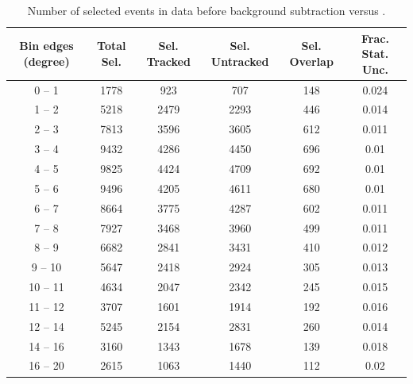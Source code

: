 \documentclass[aps,prl,twocolumn,showpacs,superscriptaddress,letterpaper,showkeys,superscriptaddress,floatfix,nofootinbib]{revtex4-1}
\begin{document}
\begin{table}[H]
  \centering
  \renewcommand{\arraystretch}{1.15}
  \caption{Number of selected events in data before background subtraction versus \thmu.}
    \begin{tabular}{c||c|c|c|c||c}
      Bin edges (degree) &  Total Sel. & Sel. Tracked & Sel. Untracked & Sel. Overlap & Frac. Stat. Unc. \\
      \hline
      \hline
        0 -- 1 & 1778 & 923 & 707 & 148 & 0.024 \\
        1 -- 2 & 5218 & 2479 & 2293 & 446 & 0.014 \\
        2 -- 3 & 7813 & 3596 & 3605 & 612 & 0.011 \\
        3 -- 4 & 9432 & 4286 & 4450 & 696 & 0.01 \\
        4 -- 5 & 9825 & 4424 & 4709 & 692 & 0.01 \\
        5 -- 6 & 9496 & 4205 & 4611 & 680 & 0.01 \\
        6 -- 7 & 8664 & 3775 & 4287 & 602 & 0.011 \\
        7 -- 8 & 7927 & 3468 & 3960 & 499 & 0.011 \\
        8 -- 9 & 6682 & 2841 & 3431 & 410 & 0.012 \\
        9 -- 10 & 5647 & 2418 & 2924 & 305 & 0.013 \\
        10 -- 11 & 4634 & 2047 & 2342 & 245 & 0.015 \\
        11 -- 12 & 3707 & 1601 & 1914 & 192 & 0.016 \\
        12 -- 14 & 5245 & 2154 & 2831 & 260 & 0.014 \\
        14 -- 16 & 3160 & 1343 & 1678 & 139 & 0.018 \\
        16 -- 20 & 2615 & 1063 & 1440 & 112 & 0.02 \\
    \end{tabular}
  \label{tbl:DataSelectionthetamu}
\end{table}
\end{document}

